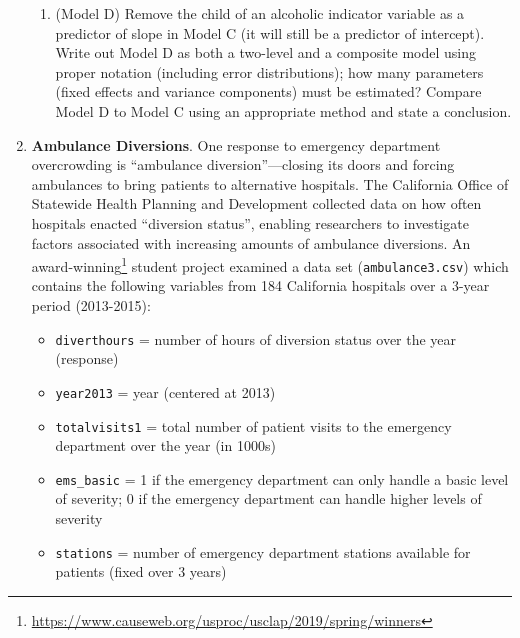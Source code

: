 \documentclass[
]{krantz}
\providecommand{\tightlist}{%
  \setlength{\itemsep}{0pt}\setlength{\parskip}{0pt}}
\renewcommand{\href}[2]{#2\footnote{\url{#1}}}
\begin{document}
\begin{enumerate}
\begin{enumerate}
  \item
    (Model D) Remove the child of an alcoholic indicator variable as a predictor of slope in Model C (it will still be a predictor of intercept). Write out Model D as both a two-level and a composite model using proper notation (including error distributions); how many parameters (fixed effects and variance components) must be estimated? Compare Model D to Model C using an appropriate method and state a conclusion.
  \end{enumerate}
\item
  \textbf{Ambulance Diversions}. One response to emergency department overcrowding is ``ambulance diversion''---closing its doors and forcing ambulances to bring patients to alternative hospitals. The California Office of Statewide Health Planning and Development collected data on how often hospitals enacted ``diversion status'', enabling researchers to investigate factors associated with increasing amounts of ambulance diversions. An \href{https://www.causeweb.org/usproc/usclap/2019/spring/winners}{award-winning} student project \citep{Radtke2019} examined a data set (\texttt{ambulance3.csv}) which contains the following variables from 184 California hospitals over a 3-year period (2013-2015):

  \begin{itemize}
  \tightlist
  \item
    \texttt{diverthours} = number of hours of diversion status over the year (response)
  \item
    \texttt{year2013} = year (centered at 2013)
  \item
    \texttt{totalvisits1} = total number of patient visits to the emergency department over the year (in 1000s)
  \item
    \texttt{ems\_basic} = 1 if the emergency department can only handle a basic level of severity; 0 if the emergency department can handle higher levels of severity
  \item
    \texttt{stations} = number of emergency department stations available for patients (fixed over 3 years)
  \end{itemize}


\end{enumerate}
\end{document}
